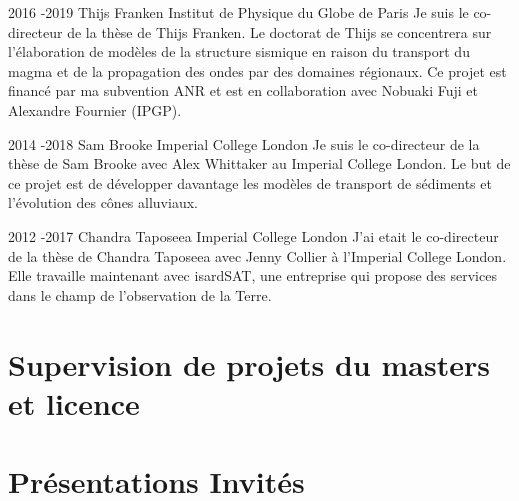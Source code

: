 \documentclass[hidelinks,10pt]{article} %
\begin{document}
\job
{2016 -}{2019}
{Thijs Franken}
{}
{Institut de Physique du Globe de Paris}
{Je suis le co-directeur de la thèse de Thijs Franken. Le doctorat de Thijs se concentrera sur l'élaboration de modèles de la structure sismique en raison du transport du magma et de la propagation des ondes par des domaines régionaux. Ce projet est financé par ma subvention ANR et est en collaboration avec Nobuaki Fuji et Alexandre Fournier (IPGP).}

\job
{2014 -}{2018}
{Sam Brooke}
{}
{Imperial College London}
{Je suis le co-directeur de la thèse de Sam Brooke avec Alex Whittaker au Imperial College London. Le but de ce projet est de développer davantage les modèles de transport de sédiments et l'évolution des cônes alluviaux.}

\job
{2012 -}{2017}
{Chandra Taposeea}
{}
{Imperial College London}
{J'ai etait le co-directeur de la thèse de Chandra Taposeea avec Jenny Collier à l'Imperial College London. Elle travaille maintenant avec isardSAT, une entreprise qui propose des services dans le champ de l'observation de la Terre.}

\section{Supervision de projets du masters et licence}



\section{Présentations Invités}
\end{document}
